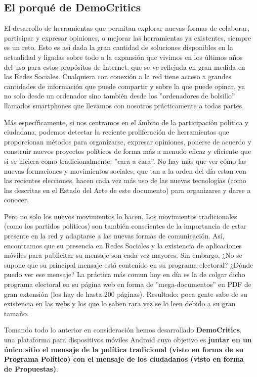\subsection{El porqué de DemoCritics}

El desarrollo de herramientas que permitan explorar nuevas formas de colaborar, participar y expresar opiniones, o mejorar las herramientas ya existentes, siempre es un reto. Esto es así dada la gran cantidad de soluciones disponibles en la actualidad y ligadas sobre todo a la expansión que vivimos en los últimos años del uso para estos propósitos de Internet, que se ve reflejada en gran medida en las Redes Sociales. Cualquiera con conexión a la red tiene acceso a grandes cantidades de información que puede compartir y sobre la que puede opinar, ya no solo desde un ordenador sino también desde los ''ordenadores de bolsillo'' llamados smartphones que llevamos con nosotros prácticamente a todas partes.

Más específicamente, si nos centramos en el ámbito de la participación política y ciudadana, podemos detectar la reciente proliferación de herramientas que proporcionan métodos para organizarse, expresar opiniones, ponerse de acuerdo y construir nuevos proyectos políticos de forma más a menudo eficaz y eficiente que si se hiciera como tradicionalmente: ''cara a cara''. No hay más que ver cómo las nuevas formaciones y movimientos sociales, que tan a la orden del día estan con las recientes elecciones, hacen cada vez más uso de las nuevas tecnologías (como las descritas en el Estado del Arte de este documento) para organizarse y darse a conocer. 

Pero no solo los nuevos movimientos lo hacen. Los movimientos tradicionales (como los partidos políticos) son también conscientes de la importancia de estar presente en la red y adaptarse a las nuevas formas de comunicación. Así, encontramos que su presencia en Redes Sociales y la existencia de aplicaciones móviles para publicitar su mensaje son cada vez mayores. Sin embargo,   ¿No se supone que su principal mensaje está contenido en su programa electoral? ¿Dónde puedo ver ese mensaje? La práctica más comun hoy en día es la de colgar dicho programa electoral en su página web en forma de ''mega-documentos'' en PDF de gran extensión (los hay de hasta 200 páginas). Resultado: poca gente sabe de su existencia en las webs y los que lo saben rara vez se lo leen debido a su gran tamaño.

Tomando todo lo anterior en consideración hemos desarrollado \textbf{DemoCritics}, una plataforma para dispositivos móviles Android cuyo objetivo es \textbf{juntar en un único sitio el mensaje de la política tradicional (visto en forma de su Programa Político) con el mensaje de los ciudadanos (visto en forma de Propuestas)}.

